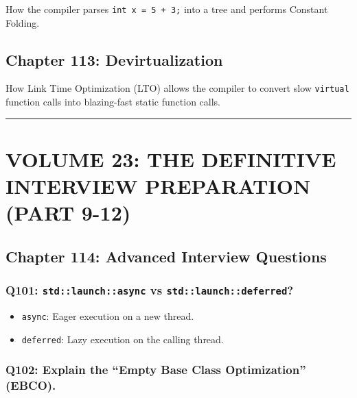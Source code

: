 How the compiler parses \passthrough{\lstinline!int x = 5 + 3;!} into a
tree and performs Constant Folding.

\hypertarget{chapter-113-devirtualization}{%
\subsection{Chapter 113:
Devirtualization}\label{chapter-113-devirtualization}}

How Link Time Optimization (LTO) allows the compiler to convert slow
\passthrough{\lstinline!virtual!} function calls into blazing-fast
static function calls.

\begin{center}\rule{0.5\linewidth}{0.5pt}\end{center}

\hypertarget{volume-23-the-definitive-interview-preparation-part-9-12}{%
\section{VOLUME 23: THE DEFINITIVE INTERVIEW PREPARATION (PART
9-12)}\label{volume-23-the-definitive-interview-preparation-part-9-12}}

\hypertarget{chapter-114-advanced-interview-questions}{%
\subsection{Chapter 114: Advanced Interview
Questions}\label{chapter-114-advanced-interview-questions}}

\hypertarget{q101-stdlaunchasync-vs-stdlaunchdeferred}{%
\subsubsection{\texorpdfstring{Q101: \texttt{std::launch::async} vs
\texttt{std::launch::deferred}?}{Q101: std::launch::async vs std::launch::deferred?}}\label{q101-stdlaunchasync-vs-stdlaunchdeferred}}

\begin{itemize}
\tightlist
\item
  \passthrough{\lstinline!async!}: Eager execution on a new thread.
\item
  \passthrough{\lstinline!deferred!}: Lazy execution on the calling
  thread.
\end{itemize}

\hypertarget{q102-explain-the-empty-base-class-optimization-ebco.}{%
\subsubsection{Q102: Explain the ``Empty Base Class Optimization''
(EBCO).}\label{q102-explain-the-empty-base-class-optimization-ebco.}}

